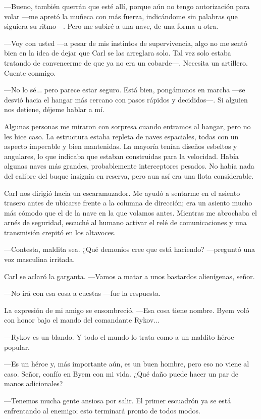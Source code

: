—Bueno, también querrán que esté allí, porque aún no tengo autorización para volar —me apretó la muñeca con más fuerza, indicándome sin palabras que siguiera su ritmo—. Pero me subiré a una nave, de una forma u otra.

—Voy con usted —a pesar de mis instintos de supervivencia, algo no me sentó bien en la idea de dejar que Carl se las arreglara solo. Tal vez solo estaba tratando de convencerme de que ya no era un cobarde—. Necesita un artillero. Cuente conmigo.

—No lo sé... pero parece estar seguro. Está bien, pongámonos en marcha —se desvió hacia el hangar más cercano con pasos rápidos y decididos—. Si alguien nos detiene, déjeme hablar a mí.

Algunas personas me miraron con sorpresa cuando entramos al hangar, pero no les hice caso. La estructura estaba repleta de naves espaciales, todas con un aspecto impecable y bien mantenidas. La mayoría tenían diseños esbeltos y angulares, lo que indicaba que estaban construidas para la velocidad. Había algunas naves más grandes, probablemente interceptores pesados. No había nada del calibre del buque insignia en reserva, pero aun así era una flota considerable.

Carl nos dirigió hacia un escaramuzador. Me ayudó a sentarme en el asiento trasero antes de ubicarse frente a la columna de dirección; era un asiento mucho más cómodo que el de la nave en la que volamos antes. Mientras me abrochaba el arnés de seguridad, escuché al humano activar el relé de comunicaciones y una transmisión crepitó en los altavoces.

—Contesta, maldita sea. ¿Qué demonios cree que está haciendo? —preguntó una voz masculina irritada.

Carl se aclaró la garganta. —Vamos a matar a unos bastardos alienígenas, señor.

—No irá con esa cosa a cuestas —fue la respuesta.

La expresión de mi amigo se ensombreció. —Esa cosa tiene nombre. Byem voló con honor bajo el mando del comandante Rykov...

—Rykov es un blando. Y todo el mundo lo trata como a un maldito héroe popular.

—Es un héroe y, más importante aún, es un buen hombre, pero eso no viene al caso. Señor, confío en Byem con mi vida. ¿Qué daño puede hacer un par de manos adicionales?

—Tenemos mucha gente ansiosa por salir. El primer escuadrón ya se está enfrentando al enemigo; esto terminará pronto de todos modos.

